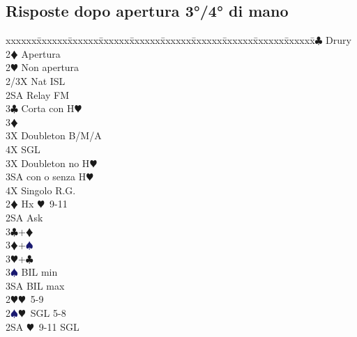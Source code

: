 \documentclass[a4paper,italian]{article}
\newcommand{\BC}{\textcolor{OliveGreen}{$\clubsuit$}}
\newcommand{\BD}{\textcolor{RedOrange}{$\vardiamondsuit$}}
\newcommand{\BH}{\textcolor{Red2}{$\varheartsuit${}}}
\newcommand{\BS}{\textcolor{MidnightBlue}{$\spadesuit${}}}
\newenvironment{bidtable}
{\begin{tabbing}

    xxxxxx\=xxxxxx\=xxxxxx\=xxxxxx\=xxxxxx\=xxxxxx\=xxxxxx\=xxxxxx\=xxxxxx\=xxxxxx\=\kill}
{\end{tabbing} }%
\begin{document}
\begin{multicols}{2}
                                        \subsection{Risposte dopo apertura 3°/4° di mano}
                                        \begin{bidtable}
                                            2\BC \> Drury\+\\
                                            2\BD \> Apertura\\
                                            2\BH \> Non apertura\\
                                            2/3X \> Nat ISL\\
                                            2SA \> Relay FM\+\\
                                            3\BC \> Corta con H\BH \+\\
                                            3\BD \> \textregistered\+\\
                                            3X \> Doubleton B/M/A\\
                                            4X \> SGL\-\-\\
                                            3X \> Doubleton no H\BH \\
                                            3SA  con o senza H\BH \\
                                            4X \> Singolo R.G.\-\-\\
                                            2\BD \> Hx \BH\ 9-11\+\\
                                            2SA \> Ask \+\\
                                            3\BC {}+\BD\\
                                            3\BD {}+\BS\\
                                            3\BH {}+\BC\\
                                            3\BS \> BIL min\\
                                            3SA \> BIL max\-\-\\
                                            2\BH {}\BH\ 5-9\\
                                            2\BS {}\BH\ SGL 5-8\\
                                            2SA \BH\ 9-11 SGL\+\\

\end{bidtable}
\end{multicols}
\end{document}
